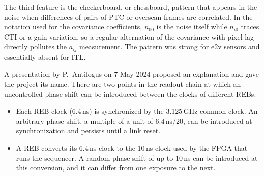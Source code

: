 %
%

The third feature is the checkerboard, or chessboard, pattern that appears in the noise when
differences of pairs of PTC or overscan frames are correlated. In the notation used for the
covariance coefficients, \(n_{00}\) is the noise itself while \(n_{i0}\) traces CTI or a
gain variation, so a regular alternation of the covariance with pixel lag directly pollutes the
\(a_{ij}\) measurement. The pattern was strong for e2v sensors and essentially absent for ITL.

A presentation by P.~Antilogus on 7 May 2024 proposed an explanation and gave the project its
name. There are two points in the readout chain at which an uncontrolled phase shift can be
introduced between the clocks of different REBs:

\begin{itemize}
    \item Each REB clock (6.4\,ns) is synchronized by the 3.125\,GHz common clock. An arbitrary
    phase shift, a multiple of a unit of 6.4\,ns/20, can be introduced at synchronization and
    persists until a link reset.
    \item A REB converts its 6.4\,ns clock to the 10\,ns clock used by the FPGA that runs the
    sequencer. A random phase shift of up to 10\,ns can be introduced at this conversion, and it
    can differ from one exposure to the next.
\end{itemize}

